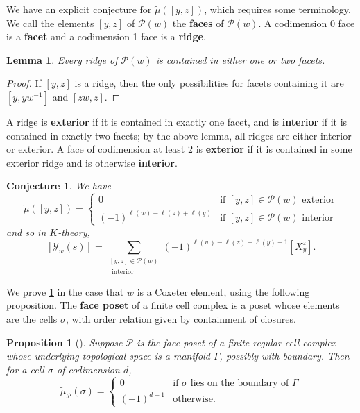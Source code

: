 \documentclass[10pt,a4paper]{amsart}
\newtheorem{lemma}[Thm]{Lemma}
\newtheorem{proposition}[Thm]{Proposition}
\newtheorem{conjecture}[Thm]{Conjecture}
\newcommand\defn[1]{{\bf #1}}
\def\calP{\mathcal{P}}
\def\mob{\tilde{\mu}}
\newcommand\calY{{\mathcal Y}}
\begin{document}
 We have an explicit conjecture for $\mob([y,z])$, which requires some terminology. We call the elements $[y,z]$ of $\calP(w)$ the \defn{faces} of $\calP(w)$. A codimension 0 face is a \defn{facet} and a codimension 1 face is a \defn{ridge}.
 
 \begin{lemma}\label{lem:ridge-in-one-or-two-facets}
 	Every ridge of $\calP(w)$ is contained in either one or two facets.
 \end{lemma}
 \begin{proof}
 	If $[y,z]$ is a ridge, then the only possibilities for facets containing it are $[y, yw^{-1}]$ and $[zw, z]$.
 \end{proof}
 
 A ridge is \textbf{exterior} if it is contained in exactly one facet, and is \textbf{interior} if it is contained in exactly two facets; by the above lemma, all ridges are either interior or exterior. A face of codimension at least 2 is \textbf{exterior} if it is contained in some exterior ridge and is otherwise \textbf{interior}.
 
 \begin{conjecture}\label{conj:mobius-fcn-and-k-thry-formula}
 	We have 
 	\[\mob([y,z]) = \begin{cases}
 		0 & \text{if $[y,z] \in \calP(w)$ exterior}\\
 		(-1)^{\ell(w)-\ell(z)+ \ell(y)} & \text{if $[y,z] \in \calP(w)$ interior}
 	\end{cases}\]
 	and so in $K$-theory,
 	\[[\calY_{w}(s)] = \sum_{\substack{[y,z]\in \calP(w) \\ \text{ interior }}} (-1)^{\ell(w)-\ell(z)+ \ell(y) +1} [X_y^z].\]
 \end{conjecture}
 
 We prove \cref{conj:mobius-fcn-and-k-thry-formula} in the case that $w$ is a Coxeter element, using the following proposition. The \defn{face poset} of a finite cell complex is a poset whose elements are the cells $\sigma$, with order relation given by containment of closures.
 
 \begin{proposition}[{\cite[Proposition 3.8.9]{Stanley-EC1}}]\label{prop:mob-fcn-for-face-poset}
 	Suppose $\calP$ is the face poset of a finite regular cell complex whose underlying topological space is a manifold $\Gamma$, possibly with boundary. Then for a cell $\sigma$ of codimension $d$,
 	\[\mob_{\calP}(\sigma) = \begin{cases}
 		0 & \text{if $\sigma$ lies on the boundary of }\Gamma\\
 		(-1)^{d+1} & \text{otherwise.}
 	\end{cases}\]
 \end{proposition}
 
\end{document}
